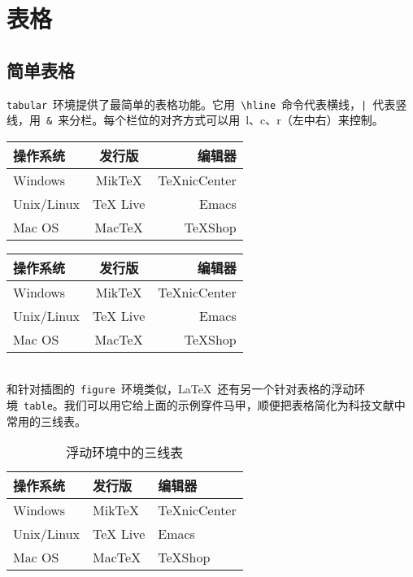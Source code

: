 \chapter{表格}
\label{sec:tables}

\section{简单表格}
\verb|tabular|~环境提供了最简单的表格功能。它用~\verb|\hline|~命令代表横线，\verb+|+~代表竖线，用~\verb|&|~来分栏。每个栏位的对齐方式可以用~l、c、r（左中右）来控制。
\begin{code}
\begin{tabular}{|l|c|r|}
    \hline 
    操作系统 & 发行版 & 编辑器 \\
    \hline 
    Windows & MikTeX & TeXnicCenter \\
    \hline 
    Unix/Linux & TeX Live & Emacs \\
    \hline 
    Mac OS & MacTeX & TeXShop \\
    \hline 
\end{tabular}
\end{code}

\begin{tabular}{|l|c|r|}
    \hline 
    操作系统 & 发行版 & 编辑器 \\
    \hline 
    Windows & MikTeX & TeXnicCenter \\
    \hline 
    Unix/Linux & TeX Live & Emacs \\
    \hline 
    Mac OS & MacTeX & TeXShop \\
    \hline 
\end{tabular}
\ \\

和针对插图的~\verb|figure|~环境类似，\LaTeX~还有另一个针对表格的浮动环境~\verb|table|。我们可以用它给上面的示例穿件马甲，顺便把表格简化为科技文献中常用的三线表。

\begin{code}
\begin{table}[htbp]
\caption{浮动环境中的三线表}
\label{tab:threesome}
\centering
\begin{tabular}{lll}
    \hline 
    操作系统 & 发行版 & 编辑器 \\
    \hline 
    Windows & MikTeX & TeXnicCenter \\
    Unix/Linux & TeX Live & Emacs \\
    Mac OS & MacTeX & TeXShop \\
    \hline 
\end{tabular}
\end{table}
\end{code}

